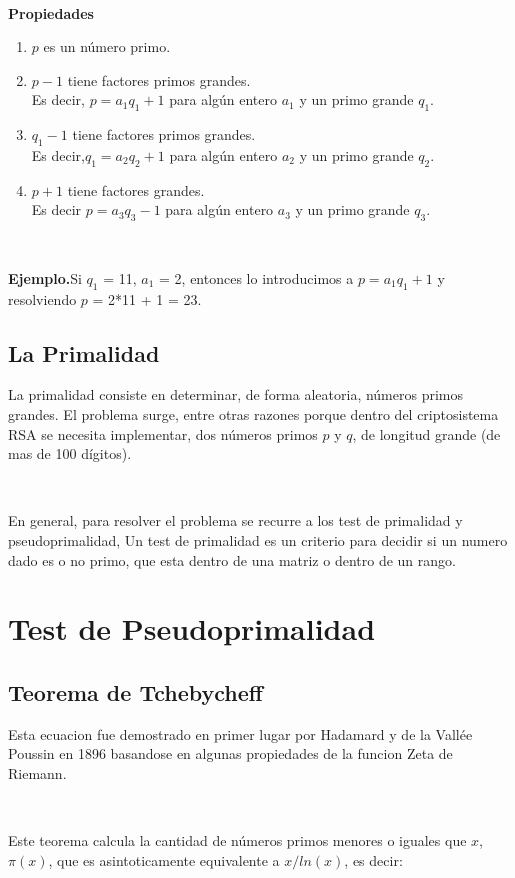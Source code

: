 \documentclass[11pt, conference]{IEEEtran}
\begin{document}
\

\textbf{Propiedades}
\begin{enumerate}
	\item $p$ es un número primo.
	\item $p-1$ tiene factores primos grandes.\\ Es decir, $p=a_{1}q_{1}+1$ para algún entero $a_{1}$ y un primo grande $q_{1}$.
	\item ${q_{1}-1}$ tiene factores primos grandes.\\ Es decir,$q_{1}=a_{2}q_{2}+1$ para algún entero $a_{2}$ y un primo grande $q_{2}$. 
	\item $p+1$ tiene factores grandes.\\ Es decir $p = a_{3}q_{3}-1$ para algún entero $a_{3}$ y un primo grande $q_{3}$. 

\end{enumerate} 

\

\textbf{Ejemplo.}Si $q_1$ = 11, $a_1$ = 2, entonces lo introducimos a $p=a_{1}q_{1}+1$ y resolviendo  $p$ = 2*11 + 1 = 23.

\subsection{La Primalidad}
La primalidad consiste en determinar, de forma aleatoria, números primos grandes. El problema surge, entre otras razones porque dentro del criptosistema RSA se necesita implementar, dos números primos $p$ y $q$, de longitud grande (de mas de 100 dígitos). 

\

En general, para resolver el problema se recurre a los test de primalidad y pseudoprimalidad, Un test de primalidad es un criterio para decidir si un numero dado es o no primo, que esta dentro de una matriz o dentro de un rango.\cite{a}

\section{Test de Pseudoprimalidad}
\subsection{Teorema de Tchebycheff}
Esta ecuacion fue demostrado en primer lugar por Hadamard y de la Vallée Poussin en 1896 basandose en algunas propiedades de la funcion Zeta de Riemann. 

\

Este teorema calcula la cantidad de números primos menores o iguales que $x$, $\pi(x)$, que es asintoticamente equivalente a $x/ln(x)$, es decir:
\end{document}
